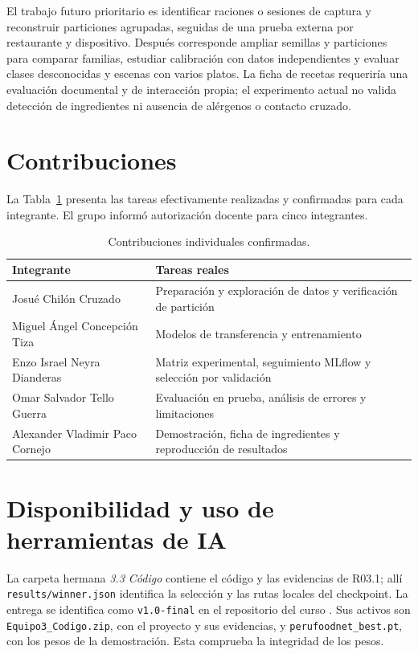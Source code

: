 \documentclass[conference]{IEEEtran}
\newcommand{\artifact}[1]{\texttt{\small #1}}
\begin{document}
El trabajo futuro prioritario es identificar raciones o sesiones de captura y reconstruir particiones agrupadas, seguidas de una prueba externa por restaurante y dispositivo. Después corresponde ampliar semillas y particiones para comparar familias, estudiar calibración con datos independientes y evaluar clases desconocidas y escenas con varios platos. La ficha de recetas requeriría una evaluación documental y de interacción propia; el experimento actual no valida detección de ingredientes ni ausencia de alérgenos o contacto cruzado.

\section*{Contribuciones}
La Tabla~\ref{tab:contributions} presenta las tareas efectivamente realizadas y confirmadas para cada integrante. El grupo informó autorización docente para cinco integrantes.

\begin{table}[ht]\centering\footnotesize
\caption{Contribuciones individuales confirmadas.}
\label{tab:contributions}
\begin{tabular}{>{\raggedright\arraybackslash\hyphenpenalty=10000}p{3.5cm}p{4cm}}\toprule
Integrante & Tareas reales\\\midrule
Josué Chilón Cruzado & Preparación y exploración de datos y verificación de partición\\
Miguel Ángel Concepción Tiza & Modelos de transferencia y entrenamiento\\
Enzo Israel Neyra Dianderas & Matriz experimental, seguimiento MLflow y selección por validación\\
Omar Salvador Tello Guerra & Evaluación en prueba, análisis de errores y limitaciones\\
Alexander Vladimir Paco Cornejo & Demostración, ficha de ingredientes y reproducción de resultados\\\bottomrule
\end{tabular}
\end{table}

\section*{Disponibilidad y uso de herramientas de IA}
La carpeta hermana \textit{3.3 Código} contiene el código y las evidencias de R03.1; allí \artifact{results/winner.json} identifica la selección y las rutas locales del checkpoint. La entrega se identifica como \texttt{v1.0-final} en el repositorio del curso \cite{entrega2026}. Sus activos son \nolinkurl{Equipo3_Codigo.zip}, con el proyecto y sus evidencias, y \nolinkurl{perufoodnet_best.pt}, con los pesos de la demostración. Esta comprueba la integridad de los pesos.
\end{document}
